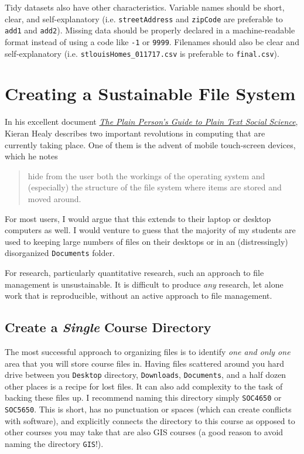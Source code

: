 \documentclass[]{book}
\begin{document}
Tidy datasets also have other characteristics. Variable names should be
short, clear, and self-explanatory (i.e. \texttt{streetAddress} and
\texttt{zipCode} are preferable to \texttt{add1} and \texttt{add2}).
Missing data should be properly declared in a machine-readable format
instead of using a code like \texttt{-1} or \texttt{9999}. Filenames
should also be clear and self-explanatory (i.e.
\texttt{stlouisHomes\_011717.csv} is preferable to \texttt{final.csv}).

\section{Creating a Sustainable File
System}\label{creating-a-sustainable-file-system}

In his excellent document \href{http://plain-text.co}{\emph{The Plain
Person's Guide to Plain Text Social Science}}, Kieran Healy describes
two important revolutions in computing that are currently taking place.
One of them is the advent of mobile touch-screen devices, which he notes

\begin{quote}
hide from the user both the workings of the operating system and
(especially) the structure of the file system where items are stored and
moved around.
\end{quote}

For most users, I would argue that this extends to their laptop or
desktop computers as well. I would venture to guess that the majority of
my students are used to keeping large numbers of files on their desktops
or in an (distressingly) disorganized \texttt{Documents} folder.

For research, particularly quantitative research, such an approach to
file management is unsustainable. It is difficult to produce \emph{any}
research, let alone work that is reproducible, without an active
approach to file management.

\subsection{\texorpdfstring{Create a \emph{Single} Course
Directory}{Create a Single Course Directory}}\label{create-a-single-course-directory}

The most successful approach to organizing files is to identify
\emph{one and only one} area that you will store course files in. Having
files scattered around you hard drive between you \texttt{Desktop}
directory, \texttt{Downloads}, \texttt{Documents}, and a half dozen
other places is a recipe for lost files. It can also add complexity to
the task of backing these files up. I recommend naming this directory
simply \texttt{SOC4650} or \texttt{SOC5650}. This is short, has no
punctuation or spaces (which can create conflicts with software), and
explicitly connects the directory to this course as opposed to other
courses you may take that are also GIS courses (a good reason to avoid
naming the directory \texttt{GIS}!).
\end{document}
